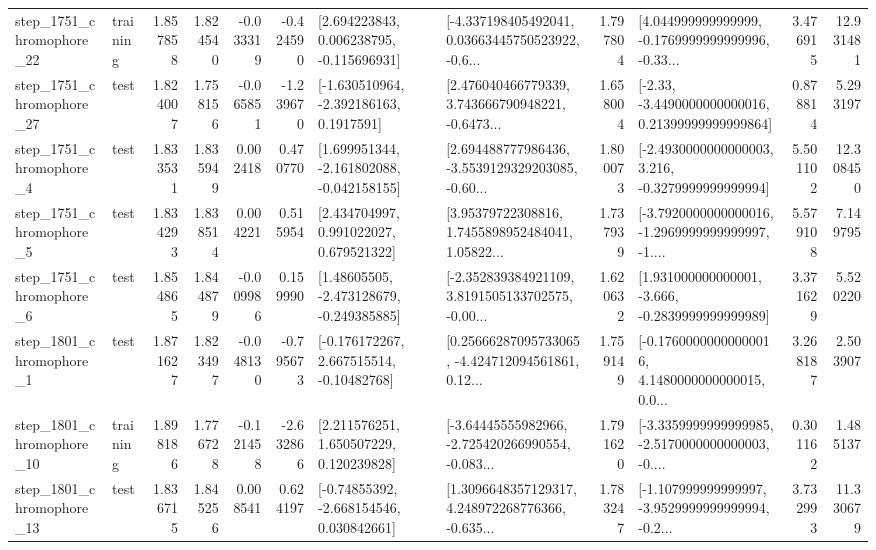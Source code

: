 \begin{tabular}{llrrrrllrlrr}
 step\_1751\_chromophore\_22 &  training &      1.857858 &    1.824540 &     -0.033319 & -0.424590 &    [2.694223843, 0.006238795, -0.115696931] &  [-4.337198405492041, 0.03663445750523922, -0.6... &       1.797804 &  [4.044999999999999, -0.1769999999999996, -0.33... &            3.476915 &         12.931481 \\
 step\_1751\_chromophore\_27 &      test &      1.824007 &    1.758156 &     -0.065851 & -1.239670 &     [-1.630510964, -2.392186163, 0.1917591] &  [2.476040466779339, 3.743666790948221, -0.6473... &       1.658004 &  [-2.33, -3.4490000000000016, 0.21399999999999864] &            0.878814 &          5.293197 \\
  step\_1751\_chromophore\_4 &      test &      1.833531 &    1.835949 &      0.002418 &  0.470770 &   [1.699951344, -2.161802088, -0.042158155] &  [2.694488777986436, -3.5539129329203085, -0.60... &       1.800073 &  [-2.4930000000000003, 3.216, -0.3279999999999994] &            5.501102 &         12.308450 \\
  step\_1751\_chromophore\_5 &      test &      1.834293 &    1.838514 &      0.004221 &  0.515954 &     [2.434704997, 0.991022027, 0.679521322] &  [3.95379722308816, 1.7455898952484041, 1.05822... &       1.737939 &  [-3.7920000000000016, -1.2969999999999997, -1.... &            5.579108 &          7.149795 \\
  step\_1751\_chromophore\_6 &      test &      1.854865 &    1.844879 &     -0.009986 &  0.159990 &    [1.48605505, -2.473128679, -0.249385885] &  [-2.352839384921109, 3.8191505133702575, -0.00... &       1.620632 &   [1.931000000000001, -3.666, -0.2839999999999989] &            3.371629 &          5.520220 \\
  step\_1801\_chromophore\_1 &      test &      1.871627 &    1.823497 &     -0.048130 & -0.795673 &    [-0.176172267, 2.667515514, -0.10482768] &  [0.25666287095733065, -4.424712094561861, 0.12... &       1.759149 &  [-0.17600000000000016, 4.1480000000000015, 0.0... &            3.268187 &          2.503907 \\
 step\_1801\_chromophore\_10 &  training &      1.898186 &    1.776728 &     -0.121458 & -2.632866 &     [2.211576251, 1.650507229, 0.120239828] &  [-3.64445555982966, -2.725420266990554, -0.083... &       1.791620 &  [-3.3359999999999985, -2.5170000000000003, -0.... &            0.301162 &          1.485137 \\
 step\_1801\_chromophore\_13 &      test &      1.836715 &    1.845256 &      0.008541 &  0.624197 &    [-0.74855392, -2.668154546, 0.030842661] &  [1.3096648357129317, 4.248972268776366, -0.635... &       1.783247 &  [-1.107999999999997, -3.9529999999999994, -0.2... &            3.732993 &         11.330679 \\

\end{tabular}
